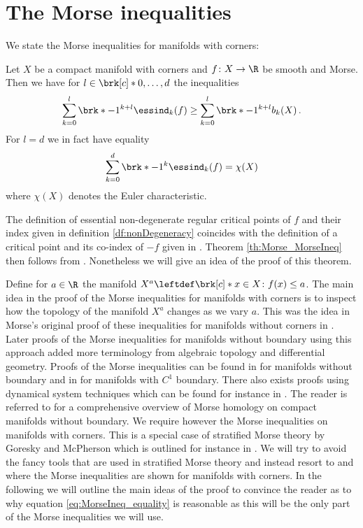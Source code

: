\section{The Morse inequalities}

We state the Morse inequalities for manifolds with corners:
\begin{theorem}
  \label{th:Morse_MorseIneq}
  Let $X$ be a compact manifold with corners and $f\colon X\to\R$ be smooth and Morse.
  Then we have for $l\in\brk[c]*{0,\dots,d}$ the inequalities
  \begin{align}
    \sum_{k=0}^l \brk*{-1}^{k+l}\essind_k(f)\geq \sum_{k=0}^l\brk*{-1}^{k+l}b_k(X)\,.
    \label{eq:MorseIneq_inequality}
  \end{align}
  For $l=d$ we in fact have equality
  \begin{align}
    \sum_{k=0}^d \brk*{-1}^{k}\essind_k(f)= \chi(X)\label{eq:MorseIneq_equality}
  \end{align}
  where $\chi(X)$ denotes the Euler characteristic.
\end{theorem}
  The definition of essential non-degenerate regular critical points of $f$ and their index given in definition \ref{df:nonDegeneracy} coincides with 
  the definition of a critical point and its co-index of $-f$ given in \cite{Agrach1991}.
  Theorem \ref{th:Morse_MorseIneq} then follows from \cite[Theorem 2.4]{Agrach1991}.
  Nonetheless we will give an idea of the proof of this theorem.

Define for $a\in\R$ the manifold $X^a\leftdef\brk[c]*{x\in X\colon f(x)\leq a}$.
The main idea in the proof of the Morse inequalities for manifolds with corners is to inspect how the topology of the manifold $X^a$ changes as we vary $a$.
This was the idea in Morse's original proof of these inequalities for manifolds without corners in \cite{Morse1925}.
Later proofs of the Morse inequalities for manifolds without boundary using this approach added more terminology from algebraic topology and differential geometry.
Proofs of the Morse inequalities can be found in \cite[§5]{Milnor1963} for manifolds without boundary and 
in \cite[Theorem 10.2']{Morse1969} for manifolds with $C^1$ boundary.
There also exists proofs using dynamical system techniques
which can be found for instance in \cite{Smale1960}.
The reader is referred to \cite{Banyaga2004} for a comprehensive overview of Morse homology
on compact manifolds without boundary.
We require however the Morse inequalities on manifolds with corners.
This is a special case of stratified Morse theory by Goresky and McPherson which is outlined for instance in \cite[§5.5]{Cisneros2020}.
We will try to avoid the fancy tools that are used in stratified Morse theory and instead
resort to \cite{Agrach1991} and \cite{Handron2002} where the Morse inequalities are shown for
manifolds with corners.
In the following we will outline the main ideas of the proof to convince the reader
as to why equation \eqref{eq:MorseIneq_equality} is reasonable as this will be the only part of the 
Morse inequalities we will use.

